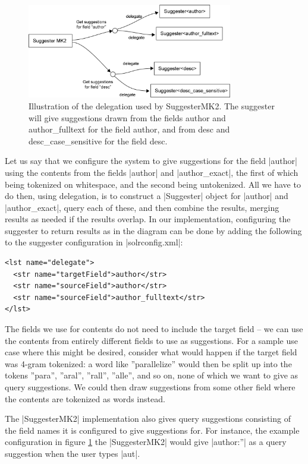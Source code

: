 \begin{figure}[h!]
    \centering
    \includegraphics[width=0.8\textwidth]{img/delegation.png}
    \caption{Illustration of the delegation used by SuggesterMK2. The suggester will give suggestions drawn from the fields author and author\_fulltext for the field author, and from desc and desc\_case\_sensitive for the field desc.}
    \label{fig:delegation}
\end{figure}

Let us say that we configure the system to give suggestions for the field |author| using the contents from the fields |author| and |author_exact|, the first of which being tokenized on whitespace, and the second being untokenized. All we have to do then, using delegation, is to construct a |Suggester| object for |author| and |author_exact|, query each of these, and then combine the results, merging results as needed if the results overlap. In our implementation, configuring the suggester to return results as in the diagram can be done by adding the following to the suggester configuration in |solrconfig.xml|:

\begin{verbatim}
<lst name="delegate">
  <str name="targetField">author</str>
  <str name="sourceField">author</str>
  <str name="sourceField">author_fulltext</str>
</lst>
\end{verbatim}

The fields we use for contents do not need to include the target field – we can use the contents from entirely different fields to use as suggestions. For a sample use case where this might be desired, consider what would happen if the target field was 4-gram tokenized: a word like ''parallelize'' would then be split up into the tokens ''para'', ''aral'', ''rall'', ''alle'', and so on, none of which we want to give as query suggestions. We could then draw suggestions from some other field where the contents are tokenized as words instead.

The |SuggesterMK2| implementation also gives query suggestions consisting of the field names it is configured to give suggestions for. For instance, the example configuration in figure \ref{fig:delegation} the |SuggesterMK2| would give |author:”| as a query suggestion when the user types |aut|.

